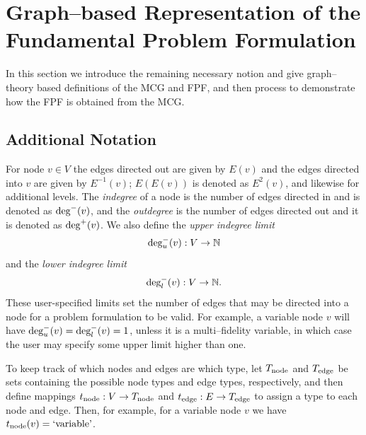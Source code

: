 \section{Graph--based Representation of the Fundamental Problem Formulation}


In this section we introduce the remaining necessary notion and give graph--theory based definitions of the MCG and FPF, and then process to demonstrate how the FPF is obtained from the MCG.

\subsection{Additional Notation}
For node $v \in V$ the edges directed out are given by $E(v)$ and the edges directed into $v$ are given by $E^{-1}(v)$; $E(E(v))$ is denoted as $E^2(v)$, and likewise for additional levels. 
The \emph{indegree} of a node is the number of edges directed in and is denoted as $\textrm{deg}^-(v)$, and the \emph{outdegree} is the number of edges directed out and it is denoted as $\textrm{deg}^+(v)$.
We also define the \emph{upper indegree limit} 
\begin{equation}
\textrm{deg}_u^-(v):V \to \mathbb{N}
\end{equation} 
and the \emph{lower indegree limit}
\begin{equation}
\textrm{deg}_l^-(v):V \to \mathbb{N}.
\end{equation}
These user-specified limits set the number of edges that may be directed into a node for a problem formulation to be valid. For example, a variable node $v$ will have $\textrm{deg}_u^-(v) = \textrm{deg}_l^-(v) = 1$, unless it is a multi--fidelity variable, in which case the user may specify some upper limit higher than one.

To keep track of which nodes and edges are which type, let $T_\textrm{node}$ and $T_\textrm{edge}$ be sets containing the possible node types and edge types, respectively, and then define mappings $t_\textrm{node}:V \to T_\textrm{node}$ and $t_\textrm{edge}:E \to T_\textrm{edge}$ to assign a type to each node and edge.
Then, for example, for a variable node $v$ we have $t_\textrm{node}(v) = \textrm{`variable'}$.





